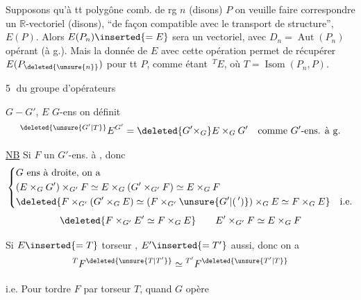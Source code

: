 Supposons qu'à tt polygône comb. de rg $n$ (disons) $P$ on veuille faire correspondre un $\mathbb{R}$-vectoriel  (disons), ``de façon compatible avec le transport de structure'',   $E(P)$. Alors $E(P_n)\inserted{=E}$ sera un vectoriel, avec $D_n=\operatorname{Aut}(P_n)$ opérant (à g.). Mais la donnée de $E$ avec cette opération permet de récupérer $E(P_{\deleted{\unsure{n}}})$ pour tt $P$, comme étant  $\,{}^TE$, où $T=\operatorname{Isom}(P_n,P)$.

\textcircled{5}  du groupe d'opérateurs

$G\mathrel{-}G'$, $E$ $G$-ens \unsure{,} on définit
\[
 {}^{\deleted{\unsure{G'|T}}}E^{G'}=\deleted{G'\times_G}E\times_G G'
 \quad\text{comme $G'$-ens. à g.}
\]

\uline{NB} Si $F$ un $G'$-ens. à , donc
\[
\left\{\begin{aligned}
 &G\text{ ens à droite, on a}\\
 &(E\times_G G')\times_{G'}F\simeq E\times_G(G'\times_{G'}F)\simeq E\times_G F\\
 &\deleted{F\times_{G'}(G'\times_G E)\simeq(F\times_{G'}\unsure{G'|(\,')})\times_G E\simeq F\times_G E}\quad\text{i.e.}
\end{aligned}\right.
\]
\[
 \deleted{F\times_{G'}E'\simeq F\times_G E}\qquad E'\times_{G'}F\simeq E\times_G F
\]

Si $E\inserted{=T}$ torseur , $E'\inserted{=T'}$ aussi, donc on a
\[
 {}^{T}F^{\deleted{\unsure{T|T'}}}\simeq{}^{T'}F^{\deleted{\unsure{T'|T}}}
\]

i.e. Pour tordre $F$ par torseur $T$, quand $G$ opère
